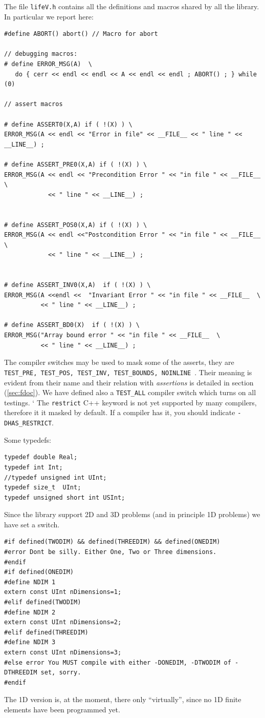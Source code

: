 The file \texttt{lifeV.h} contains all the definitions and macros shared by all the library.
In particular we report here:
\begin{verbatim}
#define ABORT() abort() // Macro for abort

// debugging macros:
# define ERROR_MSG(A)  \
   do { cerr << endl << endl << A << endl << endl ; ABORT() ; } while (0)

// assert macros
  
# define ASSERT0(X,A) if ( !(X) ) \
ERROR_MSG(A << endl << "Error in file" << __FILE__ << " line " << __LINE__) ;

# define ASSERT_PRE0(X,A) if ( !(X) ) \
ERROR_MSG(A << endl << "Precondition Error " << "in file " << __FILE__ \
            << " line " << __LINE__) ;


# define ASSERT_POS0(X,A) if ( !(X) ) \
ERROR_MSG(A << endl <<"Postcondition Error " << "in file " << __FILE__ \
            << " line " << __LINE__) ;


# define ASSERT_INV0(X,A)  if ( !(X) ) \
ERROR_MSG(A <<endl <<  "Invariant Error " << "in file " << __FILE__  \
          << " line " << __LINE__) ;

# define ASSERT_BD0(X)  if ( !(X) ) \
ERROR_MSG("Array bound error " << "in file " << __FILE__  \
          << " line " << __LINE__) ;

\end{verbatim}
The compiler switches may be used to mask some of the asserts, they
are \texttt{TEST\_PRE, TEST\_POS, TEST\_INV, TEST\_BOUNDS, NOINLINE }.
Their meaning is evident from their name and their relation with
\emph{assertions} is detailed in section (\ref{sec:fdoc}).  We have
defined also a \texttt{TEST\_ALL} compiler switch which turns on all
testings.
`
The \texttt{restrict} C++ keyword is not yet supported by many compilers, therefore it it masked by default. If a compiler has it, you should  indicate \texttt{-DHAS\_RESTRICT}.

Some typedefs:
\begin{verbatim} 
typedef double Real;
typedef int Int;
//typedef unsigned int UInt;
typedef size_t  UInt;
typedef unsigned short int USInt;
\end{verbatim}
Since the library support 2D and 3D problems (and in principle 1D problems) we have set a switch.
\begin{verbatim}
#if defined(TWODIM) && defined(THREEDIM) && defined(ONEDIM)
#error Dont be silly. Either One, Two or Three dimensions.
#endif
#if defined(ONEDIM)
#define NDIM 1
extern const UInt nDimensions=1;
#elif defined(TWODIM)
#define NDIM 2
extern const UInt nDimensions=2;
#elif defined(THREEDIM)
#define NDIM 3
extern const UInt nDimensions=3;
#else error You MUST compile with either -DONEDIM, -DTWODIM of -DTHREEDIM set, sorry.
#endif
\end{verbatim}
The 1D version is, at the moment, there only ``virtually'', since no
1D finite elements have been programmed yet.

